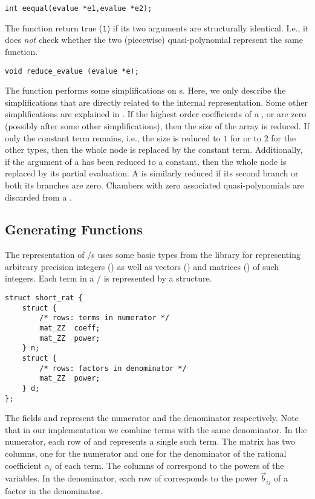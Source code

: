 \begin{verbatim}
int eequal(evalue *e1,evalue *e2);
\end{verbatim}
The function  return true (\verb+1+) if its
two arguments are structurally identical.
I.e., it does {\em not\/} check whether the two
(piecewise) quasi-polynomial represent the same function.

\begin{verbatim}
void reduce_evalue (evalue *e);
\end{verbatim}
The function  performs some
simplifications on s.
Here, we only describe the simplifications that are directly
related to the internal representation.
Some other simplifications are explained in
.
If the highest order coefficients of a ,
 or  are zero (possibly
after some other simplifications), then the size of the array
is reduced.  If only the constant term remains, i.e.,
the size is reduced to $1$ for   or to $2$
for the other types, then the whole node is replaced by
the constant term.
Additionally, if the argument of a 
has been reduced to a constant, then the whole node
is replaced by its partial evaluation.
A  is similarly reduced if its second
branch or both its branches are zero.
Chambers with zero associated quasi-polynomials are
discarded from a .

\subsection{Generating Functions}

The representation of \rgf/s uses 
some basic types from the  library 
for representing arbitrary precision integers
() 
as well as vectors () and matrices ()
of such integers.
Each term in a \rgf/ is represented by a 
structure.
\begin{verbatim}
struct short_rat {
    struct {
        /* rows: terms in numerator */
        mat_ZZ  coeff;
        mat_ZZ  power;
    } n;
    struct {
        /* rows: factors in denominator */
        mat_ZZ  power;
    } d;
};
\end{verbatim}
The fields  and  represent the
numerator and the denominator respectively.
Note that in our implementation we combine terms
with the same denominator.
In the numerator, each row of  and 
represents a single such term.
The matrix  has two columns, one for the
numerator and one for the denominator of the rational coefficient
$\alpha_i$ of each term.
The columns of  correspond to the powers
of the variables.
In the denominator, each row of 
corresponds to the power $\vec b_{ij}$ of a 
factor in the denominator.

